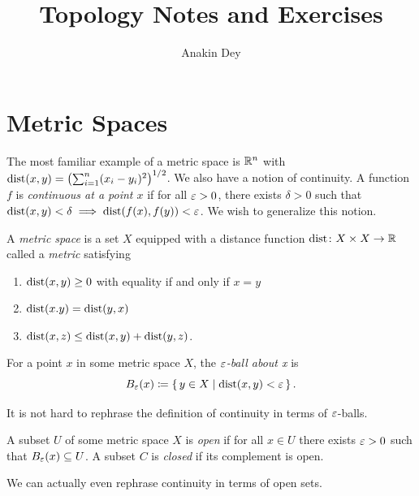 \documentclass[letterpaper, 11pt]{article}
\title{Topology Notes and Exercises}
\author{Anakin Dey}
\begin{document}
\maketitle

\listoftheorems[ignoreall, show={defn}, title={List of Definitions}]
\clearpage

\listoftheorems[ignoreall, show={ex}, title={List of Examples and Counterexamples}]
\clearpage

\section{Metric Spaces}

The most familiar example of a metric space is $\mathbb{R}^{n}$ with $\dist(x, y) = \pqty{\sum_{i = 1}^{n} (x_{i} - y_{i})^{2}}^{1/2}$.
We also have a notion of continuity.
A function $f$ is \emph{continuous at a point $x$} if for all $\varepsilon > 0$, there exists $\delta > 0$ such that $\operatorname{dist}(x, y) < \delta \implies \operatorname{dist}(f(x), f(y)) < \varepsilon$.
We wish to generalize this notion.

\begin{defn}
  A \emph{metric space} is a set $X$ equipped with a distance function $\operatorname{dist}\colon X \times X \to \mathbb{R}$ called a \emph{metric} satisfying
  \begin{enumerate}
    \item $\operatorname{dist}(x, y) \geq 0$ with equality if and only if $x = y$
    \item $\operatorname{dist}(x. y) = \operatorname{dist}(y, x)$
    \item $\operatorname{dist}(x, z) \leq \operatorname{dist}(x, y) + \operatorname{dist}(y, z)$.
  \end{enumerate}
\end{defn}

\begin{defn}[$\e$-ball]
  For a point $x$ in some metric space $X$, the \emph{$\e$-ball about x} is
  \[
    B_{\varepsilon}(x) \coloneqq \set{y \in X | \operatorname{dist}(x, y) < \varepsilon}.
  \]
\end{defn}

It is not hard to rephrase the definition of continuity in terms of $\e$-balls.

\begin{defn}
  A subset $U$ of some metric space $X$ is \emph{open} if for all $x \in U$ there exists $\varepsilon > 0$ such that $B_{\varepsilon}(x) \subseteq U$.
  A subset $C$ is \emph{closed} if its complement is open.
\end{defn}

We can actually even rephrase continuity in terms of open sets.
\end{document}
